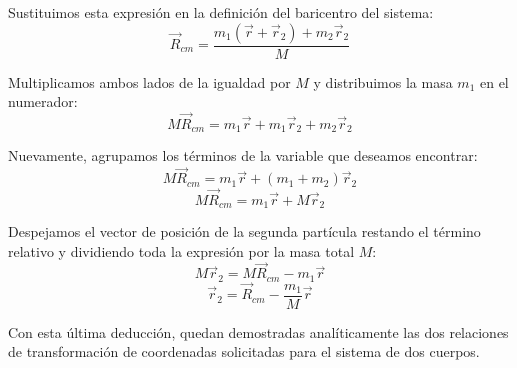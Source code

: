 \documentclass[a4paper]{article}
\begin{document}
Sustituimos esta expresión en la definición del baricentro del sistema:
$$ \vec{R}_{cm} = \frac{m_1(\vec{r} + \vec{r}_2) + m_2\vec{r}_2}{M} $$

Multiplicamos ambos lados de la igualdad por $M$ y distribuimos la masa $m_1$ en el numerador:
$$ M\vec{R}_{cm} = m_1\vec{r} + m_1\vec{r}_2 + m_2\vec{r}_2 $$

Nuevamente, agrupamos los términos de la variable que deseamos encontrar:
$$ M\vec{R}_{cm} = m_1\vec{r} + (m_1 + m_2)\vec{r}_2 $$
$$ M\vec{R}_{cm} = m_1\vec{r} + M\vec{r}_2 $$

Despejamos el vector de posición de la segunda partícula restando el término relativo y dividiendo toda la expresión por la masa total $M$:
$$ M\vec{r}_2 = M\vec{R}_{cm} - m_1\vec{r} $$
$$ \vec{r}_2 = \vec{R}_{cm} - \frac{m_1}{M}\vec{r} $$

Con esta última deducción, quedan demostradas analíticamente las dos relaciones de transformación de coordenadas solicitadas para el sistema de dos cuerpos.


 
\end{document}
